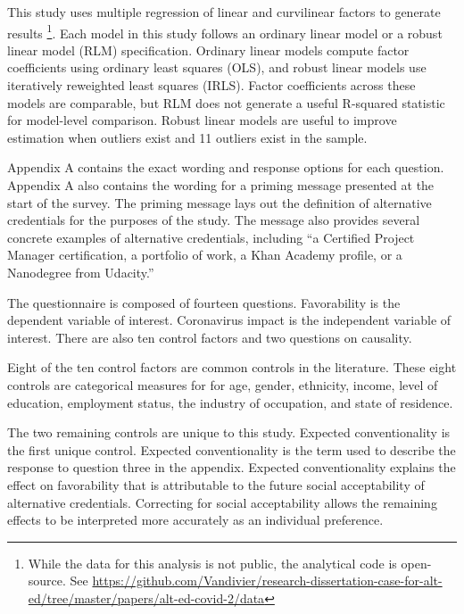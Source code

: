 \documentclass[review]{elsarticle}
\begin{document}
This study uses multiple regression of linear and curvilinear factors to generate results
\footnote{
    While the data for this analysis is not public, the analytical code is open-source.
    See \url{https://github.com/Vandivier/research-dissertation-case-for-alt-ed/tree/master/papers/alt-ed-covid-2/data}
}.
Each model in this study follows an ordinary linear model or a robust linear model (RLM) specification.
Ordinary linear models compute factor coefficients using ordinary least squares (OLS),
and robust linear models use iteratively reweighted least squares (IRLS).
Factor coefficients across these models are comparable,
but RLM does not generate a useful R-squared statistic
for model-level comparison.
Robust linear models are useful to improve estimation when outliers exist\cite{sievers2004rank}
and 11 outliers exist in the sample.

Appendix A contains the exact wording and response options for each question.
Appendix A also contains the wording for a priming message presented at the start of the survey.
The priming message lays out the definition of alternative credentials for the purposes of the study.
The message also provides several concrete examples of alternative credentials,
including ``a Certified Project Manager certification,
a portfolio of work, a Khan Academy profile, or a Nanodegree from Udacity.''

The questionnaire is composed of fourteen questions.
Favorability is the dependent variable of interest.
Coronavirus impact is the independent variable of interest.
There are also ten control factors and two questions on causality.

Eight of the ten control factors are common controls in the literature.
These eight controls are categorical measures for
for age, gender, ethnicity, income,
level of education, employment status, the industry of occupation, and state of residence.

The two remaining controls are unique to this study.
Expected conventionality is the first unique control.
Expected conventionality is the term used to describe the response to question three in the appendix.
Expected conventionality explains the effect on favorability that is
attributable to the future social acceptability of alternative credentials.
Correcting for social acceptability allows the remaining effects to be interpreted more accurately as an individual preference.
\end{document}
